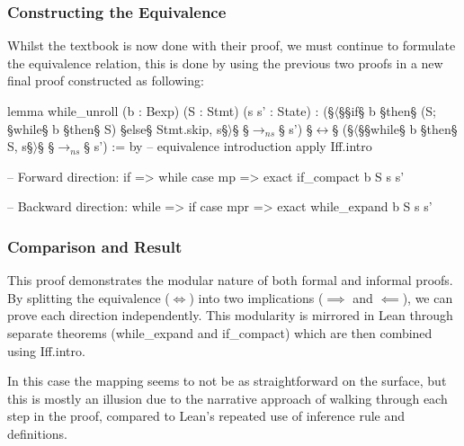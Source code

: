 \subsubsection*{Constructing the Equivalence}
Whilst the textbook is now done with their proof, we must continue to formulate the equivalence relation,
this is done by using the previous two proofs in a new final proof constructed as following:
\begin{Lean_Code}
lemma while_unroll (b : Bexp) (S : Stmt) (s s' : State) :
  (§\(\langle\)§§if§ b §then§ (S; §while§ b §then§ S) §else§ Stmt.skip, s§\(\rangle\)§ §\(\to_{ns}\)§ s')
  §\(\leftrightarrow\)§
  (§\(\langle\)§§while§ b §then§ S, s§\(\rangle\)§ §\(\to_{ns}\)§ s') := by
  -- equivalence introduction
  apply Iff.intro

  -- Forward direction: if => while
  case mp => exact if_compact b S s s'
    
  -- Backward direction: while => if
  case mpr => exact while_expand b S s s'
    
\end{Lean_Code}

\subsubsection*{Comparison and Result}
This proof demonstrates the modular nature of both formal and informal proofs.
By splitting the equivalence ($\iff$) into two implications
($\implies$ and $\impliedby$), we can prove each direction independently.
This modularity is mirrored in Lean through separate theorems
(while\_expand and if\_compact) which are then combined using Iff.intro.

In this case the mapping seems to not be as straightforward on the surface,
but this is mostly an illusion due to the narrative approach of walking through each
step in the proof, compared to Lean's repeated use of inference rule and definitions.

